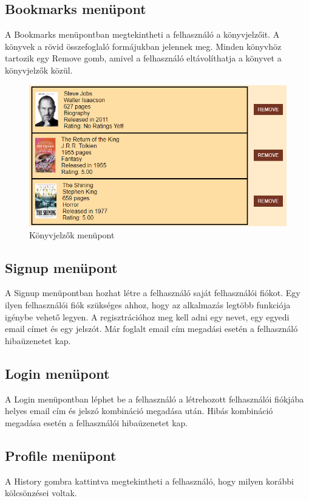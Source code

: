 \subsection{Bookmarks menüpont}
A Bookmarks menüpontban megtekintheti a felhasználó a könyvjelzőit. A könyvek a rövid összefoglaló formájukban jelennek meg. Minden könyvhöz tartozik egy Remove gomb, amivel a felhasználó eltávolíthatja a könyvet a könyvjelzők közül.

\begin{figure}[H]
    \centering
    \includegraphics[scale=0.65]{images/application/bookmarks.png}
    \caption{Könyvjelzők menüpont}
\end{figure}

\subsection{Signup menüpont}
A Signup menüpontban hozhat létre a felhasználó saját felhasználói fiókot. Egy ilyen felhasználói fiók szükséges ahhoz, hogy az alkalmazás legtöbb funkciója igénybe vehető legyen. A regisztrációhoz meg kell adni egy nevet, egy egyedi email címet és egy jelszót. Már foglalt email cím megadási esetén a felhasználó hibaüzenetet kap.

\subsection{Login menüpont}
A Login menüpontban léphet be a felhasználó a létrehozott felhasználói fiókjába helyes email cím és jelszó kombináció megadása után. Hibás kombináció megadása esetén a felhasználói hibaüzenetet kap.

\subsection{Profile menüpont}
A History gombra kattintva megtekintheti a felhasználó, hogy milyen korábbi kölcsönzései voltak.

